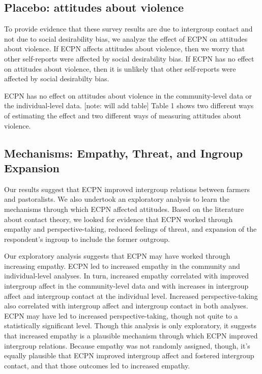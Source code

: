 \documentclass[]{article}
\begin{document}
\hypertarget{placebo-attitudes-about-violence}{%
\subsection{Placebo: attitudes about
violence}\label{placebo-attitudes-about-violence}}

To provide evidence that these survey results are due to intergroup
contact and not due to social desirability bias, we analyze the effect
of ECPN on attitudes about violence. If ECPN affects attitudes about
violence, then we worry that other self-reports were affected by social
desirability bias. If ECPN has no effect on attitudes about violence,
then it is unlikely that other self-reports were affected by social
desirabilty bias.

ECPN has no effect on attitudes about violence in the community-level
data or the individual-level data. {[}note: will add table{]} Table 1
shows two different ways of estimating the effect and two different ways
of measuring attitudes about violence.

\hypertarget{mechanisms-empathy-threat-and-ingroup-expansion}{%
\subsection{Mechanisms: Empathy, Threat, and Ingroup
Expansion}\label{mechanisms-empathy-threat-and-ingroup-expansion}}

Our results suggest that ECPN improved intergroup relations between
farmers and pastoralists. We also undertook an exploratory analysis to
learn the mechanisms through which ECPN affected attitudes. Based on the
literature about contact theory, we looked for evidence that ECPN worked
through empathy and perspective-taking, reduced feelings of threat, and
expansion of the respondent's ingroup to include the former outgroup.

Our exploratory analysis suggests that ECPN may have worked through
increasing empathy. ECPN led to increased empathy in the community and
individual-level analyses. In turn, increased empathy correlated with
improved intergroup affect in the community-level data and with
increases in intergroup affect and intergroup contact at the individual
level. Increased perspective-taking also correlated with intergroup
affect and intergroup contact in both analyses. ECPN may have led to
increased perspective-taking, though not quite to a statistically
significant level. Though this analysis is only exploratory, it suggests
that increased empathy is a plausible mechanism through which ECPN
improved intergroup relations. Because empathy was not randomly
assigned, though, it's equally plausible that ECPN improved intergroup
affect and fostered intergroup contact, and that those outcomes led to
increased empathy.
\end{document}

